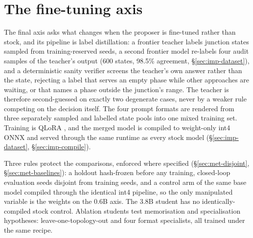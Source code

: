 \section{The fine-tuning axis}\label{sec:des-ft}
The final axis asks what changes when the proposer is fine-tuned rather
than stock, and its pipeline is label distillation: a frontier teacher labels
junction states sampled from training-reserved seeds, a second frontier
model re-labels four audit samples of the teacher's output (600 states,
98.5\% agreement, \S\ref{sec:imp-dataset}), and a deterministic sanity verifier
screens the teacher's own answer rather than the state, rejecting a label
that serves an empty phase while other approaches are waiting, or that
names a phase outside the junction's range. The teacher
is therefore second-guessed on exactly two degenerate cases, never by a
weaker rule competing on the decision itself. The four prompt
formats are rendered from three separately sampled and labelled state pools
into one mixed training set. Training is QLoRA
\cite{dettmers2023qlora}, and the merged model is compiled to weight-only
int4 ONNX and served through the same runtime as every stock model
(\S\ref{sec:imp-dataset}, \S\ref{sec:imp-compile}).

Three rules protect the comparisons, enforced where specified
(\S\ref{sec:met-disjoint}, \S\ref{sec:met-baselines}): a holdout
hash-frozen before any training, closed-loop evaluation seeds disjoint
from training seeds, and a control arm of the same base model compiled
through the identical int4 pipeline, so the only manipulated variable is
the weights on the 0.6B axis. The 3.8B student has no identically-compiled
stock control. Ablation students test memorisation and specialisation
hypotheses: leave-one-topology-out and four format specialists, all
trained under the same recipe.
